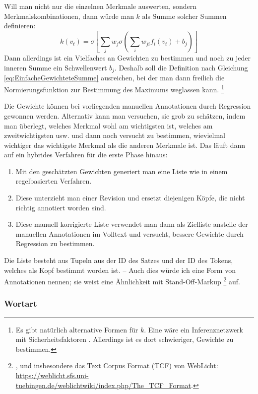 \documentclass{article}
\renewcommand*{\see}{\autocap{v}gl\adddot}%
\begin{document}
Will man nicht nur die einzelnen Merkmale auswerten, sondern
Merkmalskombinationen, dann würde man $k$ als Summe solcher Summen
definieren:
\begin{equation}
  k(v_t) = \sigma\left[ \sum\limits_jw_j\sigma \left( \sum\limits_iw_{ji}f_i(v_t) +b_j\right)\right]
\end{equation}
Dann allerdings ist ein Vielfaches an Gewichten zu bestimmen und noch
zu jeder inneren Summe ein Schwellenwert $b_j$. Deshalb soll die
Definition nach Gleichung \ref{eq:EinfacheGewichteteSumme} ausreichen,
bei der man dann freilich die Normierungsfunktion zur Bestimmung des
Maximums weglassen kann.%
\footnote{Es gibt natürlich alternative Formen für $k$. Eine wäre ein
  Inferenznetzwerk mit
  Sicherheitsfaktoren \parencite[\see][90--96]{Beierle2014a}. Allerdings
  ist es dort schwieriger, Gewichte zu bestimmen.}

Die Gewichte können bei vorliegenden manuellen Annotationen durch
Regression gewonnen werden. Alternativ kann man versuchen, sie grob zu
schätzen, indem man überlegt, welches Merkmal wohl am wichtigsten ist,
welches am zweitwichtigsten usw. und dann noch versucht zu bestimmen,
wievielmal wichtiger das wichtigste Merkmal als die anderen Merkmale
ist. Das läuft dann auf ein hybrides Verfahren für die erste Phase
hinaus:
\begin{enumerate}%
\item Mit den geschätzten Gewichten generiert man eine Liste wie in
  einem regelbasierten Verfahren.
\item Diese unterzieht man einer Revision
  und ersetzt diejenigen Köpfe, die nicht richtig annotiert worden
  sind.
\item Diese manuell korrigierte Liste verwendet man dann als Zielliste
  anstelle der manuellen Annotationen im Volltext und versucht,
  bessere Gewichte durch Regression zu bestimmen.
\end{enumerate}
Die Liste besteht aus Tupeln aus der ID des Satzes und der ID des
Tokens, welches als Kopf bestimmt worden ist. -- Auch dies würde ich
eine Form von Annotationen nennen; sie weist eine Ähnlichkeit mit
Stand-Off-Markup%
\footnote{\Cite[\see\ z.\,B.][575--579]{TEIP5}, und insbesondere das
  Text Corpus Format (TCF) von WebLicht:
  \url{https://weblicht.sfs.uni-tuebingen.de/weblichtwiki/index.php/The_TCF_Format}.} %
auf.


\subsubsection{Wortart}
\end{document}
